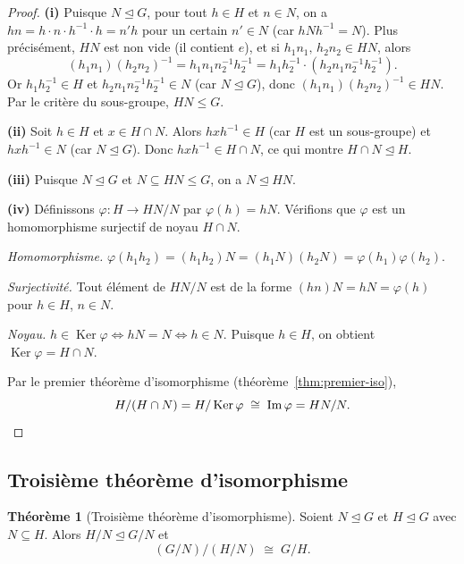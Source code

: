 \documentclass[12pt,a4paper,openany]{book}
\theoremstyle{definition}
\newtheorem{theoreme}{Théorème}[chapter]
\DeclareMathOperator{\Ker}{Ker}
\renewcommand{\Im}{\operatorname{Im}}
\begin{document}
\begin{proof}
  \textbf{(i)} Puisque $N\trianglelefteq G$, pour tout $h\in H$ et
  $n\in N$, on a $hn = h\cdot n\cdot h^{-1}\cdot h = n' h$ pour un
  certain $n'\in N$ (car $hNh^{-1}=N$). Plus précisément, $HN$ est
  non vide (il contient $e$), et si $h_1n_1,\, h_2n_2\in HN$, alors
  \[
    (h_1n_1)(h_2n_2)^{-1} = h_1n_1 n_2^{-1}h_2^{-1}
    = h_1 h_2^{-1}\cdot(h_2 n_1 n_2^{-1} h_2^{-1}).
  \]
  Or $h_1h_2^{-1}\in H$ et $h_2 n_1n_2^{-1}h_2^{-1}\in N$ (car
  $N\trianglelefteq G$), donc $(h_1n_1)(h_2n_2)^{-1}\in HN$.
  Par le critère du sous-groupe, $HN\leq G$.

  \medskip

  \textbf{(ii)} Soit $h\in H$ et $x\in H\cap N$. Alors
  $hxh^{-1}\in H$ (car $H$ est un sous-groupe) et $hxh^{-1}\in N$
  (car $N\trianglelefteq G$). Donc $hxh^{-1}\in H\cap N$, ce qui
  montre $H\cap N\trianglelefteq H$.

  \medskip

  \textbf{(iii)} Puisque $N\trianglelefteq G$ et $N\subseteq HN\leq G$,
  on a $N\trianglelefteq HN$.

  \medskip

  \textbf{(iv)} Définissons $\varphi\colon H\to HN/N$ par
  $\varphi(h) = hN$. Vérifions que $\varphi$ est un homomorphisme
  surjectif de noyau $H\cap N$.

  \emph{Homomorphisme.} $\varphi(h_1h_2) = (h_1h_2)N =
  (h_1N)(h_2N) = \varphi(h_1)\varphi(h_2)$.

  \emph{Surjectivité.} Tout élément de $HN/N$ est de la forme
  $(hn)N = hN = \varphi(h)$ pour $h\in H$, $n\in N$.

  \emph{Noyau.} $h\in\Ker\varphi \iff hN = N \iff h\in N$.
  Puisque $h\in H$, on obtient $\Ker\varphi = H\cap N$.

  Par le premier théorème d'isomorphisme
  (théorème~\ref{thm:premier-iso}),
  \[
    H/(H\cap N) = H/\Ker\varphi \;\cong\; \Im\varphi = HN/N. \qedhere
  \]
\end{proof}

\subsection{Troisième théorème d'isomorphisme}\label{subsec:troisieme-iso}

\begin{theoreme}[Troisième théorème d'isomorphisme]\label{thm:troisieme-iso}
  Soient $N\trianglelefteq G$ et $H\trianglelefteq G$ avec $N\subseteq H$.
  Alors $H/N\trianglelefteq G/N$ et
  \[
    (G/N)\big/(H/N) \;\cong\; G/H.
  \]
\end{theoreme}
\end{document}
